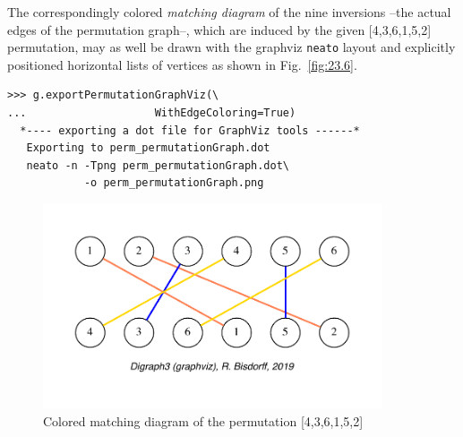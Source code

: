 The correspondingly colored \emph{matching diagram} of the nine inversions --the actual edges of the permutation graph--, which are induced by the given [4,3,6,1,5,2] permutation, may as well be drawn with the graphviz \texttt{neato} layout and explicitly positioned horizontal lists of vertices as shown in Fig.~\vref{fig:23.6}.
\begin{lstlisting}
>>> g.exportPermutationGraphViz(\
...                    WithEdgeColoring=True)
  *---- exporting a dot file for GraphViz tools ------*
   Exporting to perm_permutationGraph.dot
   neato -n -Tpng perm_permutationGraph.dot\
            -o perm_permutationGraph.png
\end{lstlisting}
\begin{figure}[h]
\sidecaption
\includegraphics[width=10cm]{Figures/23-6-perm_permutationGraph.pdf}
\caption{Colored matching diagram of the permutation [4,3,6,1,5,2]} 
\label{fig:23.6}       %
\end{figure}

